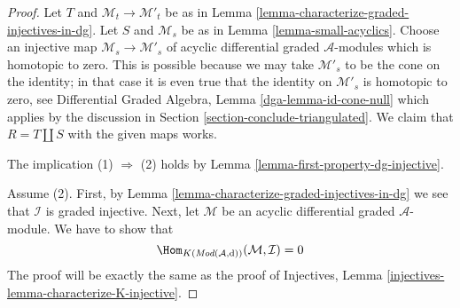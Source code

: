 \begin{proof}
Let $T$ and $\mathcal{M}_t \to \mathcal{M}'_t$ be as in
Lemma \ref{lemma-characterize-graded-injectives-in-dg}.
Let $S$ and $\mathcal{M}_s$ be as in
Lemma \ref{lemma-small-acyclics}.
Choose an injective map $\mathcal{M}_s \to \mathcal{M}'_s$
of acyclic differential graded $\mathcal{A}$-modules
which is homotopic to zero. This is possible because we
may take $\mathcal{M}'_s$ to be the cone on the identity;
in that case it is even true that the identity on
$\mathcal{M}'_s$ is homotopic to zero, see
Differential Graded Algebra, Lemma \ref{dga-lemma-id-cone-null} which
applies by the discussion in Section \ref{section-conclude-triangulated}.
We claim that $R = T \coprod S$ with the given maps works.

\medskip\noindent
The implication (1) $\Rightarrow$ (2) holds by
Lemma \ref{lemma-first-property-dg-injective}.

\medskip\noindent
Assume (2). First, by Lemma \ref{lemma-characterize-graded-injectives-in-dg}
we see that $\mathcal{I}$ is graded injective. Next, let
$\mathcal{M}$ be an acyclic differential graded $\mathcal{A}$-module.
We have to show that
$$
\Hom_{K(\textit{Mod}(\mathcal{A}, \text{d}))}(\mathcal{M}, \mathcal{I}) = 0
$$
The proof will be exactly the same as the proof of
Injectives, Lemma \ref{injectives-lemma-characterize-K-injective}.


\end{proof}
